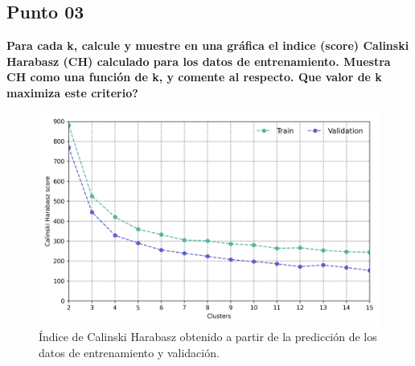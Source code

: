 \subsection*{Punto 03}

\textbf{Para cada k, calcule y muestre en una gráfica el indice (score) Calinski Harabasz (CH) calculado para los datos de entrenamiento. Muestra CH como una función de k, y comente al respecto. Que valor de k maximiza este criterio?}

\begin{figure}[H]
    \centering
    \includegraphics[width=15cm]{Graphics/Problema_03/calinski_harabasz_score.png}
    \caption{Índice de Calinski Harabasz obtenido a partir de la predicción de los datos de entrenamiento y validación.}
    \label{fig:problema_03_calinski_score}
\end{figure}